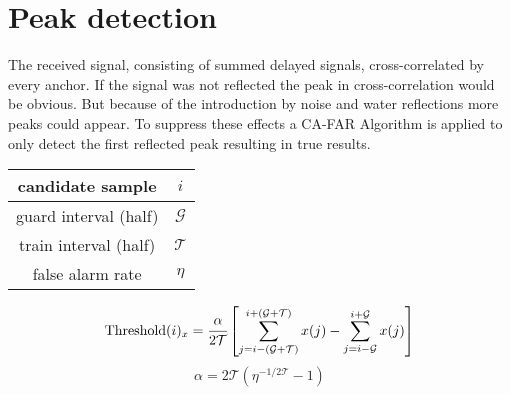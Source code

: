 \documentclass[en,abstract,acknowledgment,symbollist,inputenc=utf8]{tuhhthesis}
\begin{document}
\section{Peak detection}
The received signal, consisting of summed delayed signals, cross-correlated by every anchor. If the signal was not reflected the peak in cross-correlation would be obvious. But because of the introduction by noise and water reflections more peaks could appear. To suppress these effects a CA-FAR Algorithm \cite{rohling11} is applied to only detect the first reflected peak resulting in true results. 
\begin{center}
\begin{tabular}{|c|c|}
	\hline
	candidate sample & $i$\\
	\hline
	guard interval (half) & $\mathcal{G}$ \\
	\hline
	train interval (half) & $\mathcal{T}$ \\
	\hline
	false alarm rate & $\eta$\\
	\hline
\end{tabular}
\linebreak
\end{center}

\begin{equation}
	\text{Threshold}(i)_x=
	\cfrac{\alpha}{2\mathcal{T}}
	\left[ \sum_{j=i-\left( \mathcal{G}+\mathcal{T}\right) }^{i+\left( \mathcal{G}+\mathcal{T}\right)}x(j) - \sum_{j=i-\mathcal{G}}^{i+\mathcal{G}}x(j) \right] 
\end{equation}
\begin{equation}
	\alpha=2\mathcal{T}\left( \eta^{-1/{2\mathcal{T}}}-1\right) 
\end{equation}
%
%
%
%
%




\begin{tuhhappendix}
  
\end{tuhhappendix}


\end{document}
